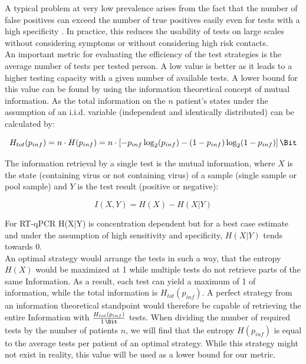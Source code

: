 \documentclass[fleqn,10pt]{wlscirep}
\begin{document}
	A typical problem at very low prevalence arises from the fact that the number of false positives can exceed the number of true positives easily even for tests with a high specificity \cite{ppv_problem}. In practice, this reduces the usability of tests on large scales without considering symptoms or without considering high risk contacts.\\
	
	An important metric for evaluating the efficiency of the test strategies is the average number of tests per tested person. A low value is better as it leads to a higher testing capacity with a given number of available tests. A lower bound for this value can be found by using the information theoretical concept of mutual information. As the total information on the $n$ patient’s states under the assumption of an i.i.d. variable (independent and identically distributed) can be calculated by:
	
	\begin{ceqn}
		\begin{equation}
		H_{tot}(p_{inf}) = n \cdot H(p_{inf}) = n \cdot \left[-p_{inf} \log_2(p_{inf}) - (1-p_{inf}) \log_2(1 - p_{inf})\right] \si{\Bit}
		\end{equation}
	\end{ceqn}
	
	The information retrieval by a single test is the mutual information, where $X$ is the state (containing virus or not containing virus) of a sample (single sample or pool sample) and $Y$ is the test result (positive or negative):
	\begin{ceqn}
		\begin{equation}
		I(X,Y) = H(X) - H(X|Y)
		\end{equation}
	\end{ceqn}
	For RT-qPCR H(X|Y) is concentration dependent but for a best case estimate and under the assumption of high sensitivity and specificity, $H(X|Y)$ tends towards $0$. \\
	
	An optimal strategy would arrange the tests in such a way, that the entropy $H(X)$ would be maximized at \SI{1}{\Bit} while multiple tests do not retrieve parts of the same Information. As a result, each test can yield a maximum of \SI{1}{\Bit} of information, while the total information is $H_{tot}(p_{inf})$. A perfect strategy from an information theoretical standpoint would therefore be capable of retrieving the entire Information with $\frac{H_{tot}(p_{inf})}{\SI{1}{\Bit}}$ tests. When dividing the number of required tests by the number of patients $n$, we will find that the entropy $H(p_{inf})$ is equal to the average tests per patient of an optimal strategy. While this strategy might not exist in reality, this value will be used as a lower bound for our metric.\\
	
\end{document}
